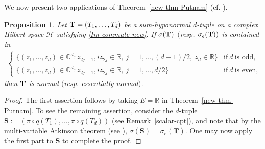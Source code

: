 \documentclass[10pt, a4paper, oneside, reqno]{amsproc}
\numberwithin{equation}{section}
\newtheorem{proposition}[theorem]{Proposition}
\theoremstyle{remark}
\theoremstyle{definition}
\begin{document}
We now present two applications of Theorem~\ref{new-thm-Putnam} (cf. \cite[Theorem~3]{DY1992}). 
\begin{proposition} 
Let ${\bf T}=(T_1, \ldots, T_d)$ be a sum-hyponormal $d$-tuple on a complex Hilbert space $\mathcal H$ satisfying
\eqref{Im-commute-new}.
If $\sigma({\bf T})$ $($resp. $\sigma_e({\bf T}))$ is contained in 
\begin{align*}
\begin{cases} \{(z_1, \ldots, z_d) \in \mathbb C^d: z_{2j-1}, iz_{2j}  \in \mathbb R,~j=1,  \ldots, (d-1)/2, ~ z_d \in \mathbb R\} & \mbox{if}~d ~\mbox{is odd},\\ 
\{(z_1, \ldots, z_d) \in \mathbb C^d: z_{2j-1}, iz_{2j}  \in \mathbb R,~j=1,  \ldots, d/2\} & \mbox{if}~d ~\mbox{is even},
\end{cases}
\end{align*}
then ${\bf T}$ is normal $($resp. essentially normal$)$.
\end{proposition}
\begin{proof} The first assertion follows by taking $E=\mathbb R$ in Theorem~\ref{new-thm-Putnam}. To see the remaining assertion, consider the $d$-tuple
$
\mathbf{S}:=(\pi \circ q(T_1), \ldots, \pi \circ q(T_d))$ (see Remark~\ref{scalar-cpt}),
and note that by the multi-variable Atkinson theorem (see \cite[Theorem~2]{Cu1981}), $\sigma(\mathbf{S})=\sigma_e(\mathbf{T}).$ 
One may now apply the first part to $\mathbf{S}$ to complete the proof.   
\end{proof}
\end{document}
